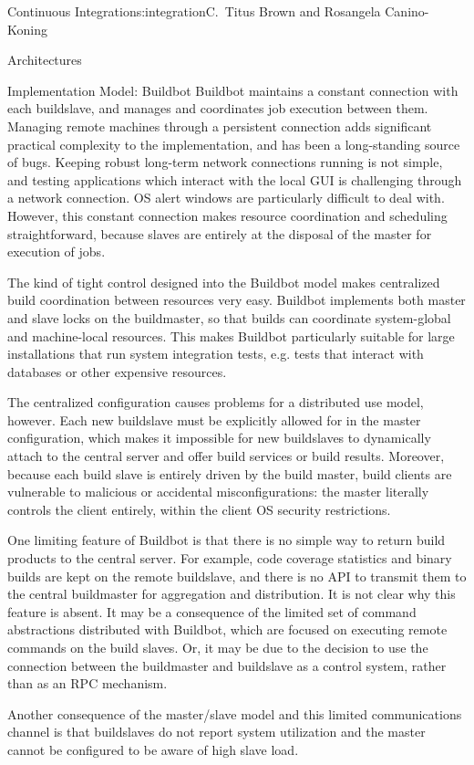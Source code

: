 \begin{aosachapter}{Continuous Integration}{s:integration}{C.\ Titus Brown and Rosangela Canino-Koning}
\begin{aosasect1}{Architectures}
\begin{aosasect2}{Implementation Model: Buildbot}
Buildbot maintains a constant connection with each buildslave, and
manages and coordinates job execution between them.  Managing remote
machines through a persistent connection adds significant practical
complexity to the implementation, and has been a long-standing source
of bugs.  Keeping robust long-term network connections running is not
simple, and testing applications which interact with the local GUI is
challenging through a network connection. OS alert windows are
particularly difficult to deal with.  However, this constant
connection makes resource coordination and scheduling straightforward,
because slaves are entirely at the disposal of the master for
execution of jobs.

The kind of tight control designed into the Buildbot model makes
centralized build coordination between resources very easy. Buildbot
implements both master and slave locks on the buildmaster, so that
builds can coordinate system-global and machine-local resources. This
makes Buildbot particularly suitable for large installations that run
system integration tests, e.g. tests that interact with databases or
other expensive resources.

The centralized configuration causes problems for a distributed use
model, however. Each new buildslave must be explicitly allowed for in
the master configuration, which makes it impossible for new
buildslaves to dynamically attach to the central server and offer
build services or build results. Moreover, because each build slave is
entirely driven by the build master, build clients are vulnerable to
malicious or accidental misconfigurations: the master literally
controls the client entirely, within the client OS security
restrictions.

One limiting feature of Buildbot is that there is no simple way to
return build products to the central server. For example, code
coverage statistics and binary builds are kept on the remote
buildslave, and there is no API to transmit them to the central
buildmaster for aggregation and distribution. It is not clear why this
feature is absent. It may be a consequence of the limited set of
command abstractions distributed with Buildbot, which are focused on
executing remote commands on the build slaves. Or, it may be due to
the decision to use the connection between the buildmaster and
buildslave as a control system, rather than as an RPC mechanism.

Another consequence of the master/slave model and this limited
communications channel is that buildslaves do not report system
utilization and the master cannot be configured to be aware of high
slave load.


\end{aosasect2}
\end{aosasect1}
\end{aosachapter}
